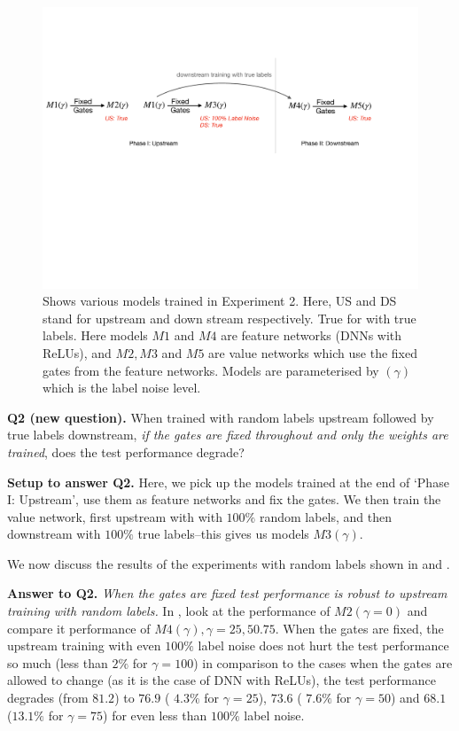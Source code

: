 \begin{figure}[h]
\centering
\includegraphics[scale=0.3]{figs/rand-label-big.pdf}
\caption{Shows various models trained in Experiment 2. Here, US and DS stand for upstream and down stream respectively. True for with true labels. Here models $M1$ and $M4$ are feature networks (DNNs with ReLUs), and $M2, M3$ and $M5$ are value networks which use the fixed gates from the feature networks. Models are parameterised by $(\gamma)$ which is the label noise level.}
\label{fig:rand-label-setup}
\end{figure}


\textbf{Q2 (new question).} {When trained with random labels upstream followed by true labels downstream, \emph{if the gates are fixed throughout and only the weights are trained}, does the test performance degrade?}

\textbf{Setup to answer Q2.} Here, we pick up the models trained at the end of `Phase I: Upstream', use them as feature networks and fix the gates. We then train the value network, first upstream with with $100\%$ random labels, and then downstream with $100\%$ true labels--this gives us models $M3(\gamma)$.

We now discuss the results of the experiments with random labels shown in  and . 

\textbf{Answer to Q2.} \emph{When the gates are fixed test performance is robust to upstream training with random labels.} In  , look at the performance of $M2(\gamma=0)$ and compare it performance of  $M4(\gamma), \gamma=25,50.75$. When the gates are fixed, the upstream training with even $100\%$ label noise does not hurt the test performance so much (less than $2\%$ for $\gamma=100$) in comparison to the cases when the gates are allowed to change (as it is the case of DNN with ReLUs), the test performance degrades (from $81.2$) to $76.9$ ( $ 4.3\%$ for $\gamma=25$), $73.6$ ( $7.6\%$ for $\gamma=50$) and  $68.1$ ($13.1\%$ for $\gamma=75$) for even less than $100\%$ label noise.



